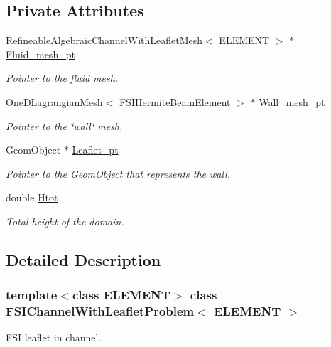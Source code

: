 \subsection*{Private Attributes}
\begin{DoxyCompactItemize}
\item 
Refineable\+Algebraic\+Channel\+With\+Leaflet\+Mesh$<$ E\+L\+E\+M\+E\+NT $>$ $\ast$ \hyperlink{classFSIChannelWithLeafletProblem_a40cee3652918bdcf67569afc89d3074d}{Fluid\+\_\+mesh\+\_\+pt}
\begin{DoxyCompactList}\small\item\em Pointer to the fluid mesh. \end{DoxyCompactList}\item 
One\+D\+Lagrangian\+Mesh$<$ F\+S\+I\+Hermite\+Beam\+Element $>$ $\ast$ \hyperlink{classFSIChannelWithLeafletProblem_a943437726f0a54fa8f7fc9ffb12bc4cd}{Wall\+\_\+mesh\+\_\+pt}
\begin{DoxyCompactList}\small\item\em Pointer to the \char`\"{}wall\char`\"{} mesh. \end{DoxyCompactList}\item 
Geom\+Object $\ast$ \hyperlink{classFSIChannelWithLeafletProblem_ade82d11fc4bdd54b848f02361f8cc99e}{Leaflet\+\_\+pt}
\begin{DoxyCompactList}\small\item\em Pointer to the Geom\+Object that represents the wall. \end{DoxyCompactList}\item 
double \hyperlink{classFSIChannelWithLeafletProblem_a765a35c452989fa2d54bc1441d04925c}{Htot}
\begin{DoxyCompactList}\small\item\em Total height of the domain. \end{DoxyCompactList}\end{DoxyCompactItemize}


\subsection{Detailed Description}
\subsubsection*{template$<$class E\+L\+E\+M\+E\+NT$>$\newline
class F\+S\+I\+Channel\+With\+Leaflet\+Problem$<$ E\+L\+E\+M\+E\+N\+T $>$}

F\+SI leaflet in channel. 

